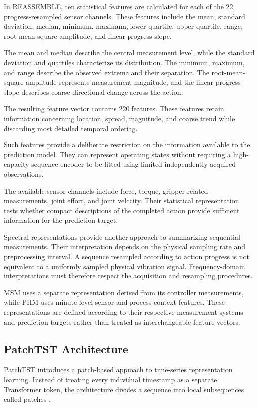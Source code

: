 In REASSEMBLE, ten statistical features are calculated for each of the 22 progress-resampled sensor channels. These features include the mean, standard deviation, median, minimum, maximum, lower quartile, upper quartile, range, root-mean-square amplitude, and linear progress slope.

The mean and median describe the central measurement level, while the standard deviation and quartiles characterize its distribution. The minimum, maximum, and range describe the observed extrema and their separation. The root-mean-square amplitude represents measurement magnitude, and the linear progress slope describes coarse directional change across the action.

The resulting feature vector contains 220 features. These features retain information concerning location, spread, magnitude, and coarse trend while discarding most detailed temporal ordering.

Such features provide a deliberate restriction on the information available to the prediction model. They can represent operating states without requiring a high-capacity sequence encoder to be fitted using limited independently acquired observations.

The available sensor channels include force, torque, gripper-related measurements, joint effort, and joint velocity. Their statistical representation tests whether compact descriptions of the completed action provide sufficient information for the prediction target.

Spectral representations provide another approach to summarizing sequential measurements. Their interpretation depends on the physical sampling rate and preprocessing interval. A sequence resampled according to action progress is not equivalent to a uniformly sampled physical vibration signal. Frequency-domain interpretations must therefore respect the acquisition and resampling procedures.

MSM uses a separate representation derived from its controller measurements, while PHM uses minute-level sensor and process-context features. These representations are defined according to their respective measurement systems and prediction targets rather than treated as interchangeable feature vectors.

\subsection{PatchTST Architecture}

PatchTST introduces a patch-based approach to time-series representation learning. Instead of treating every individual timestamp as a separate Transformer token, the architecture divides a sequence into local subsequences called patches \parencite{Nie2023PatchTST}.

